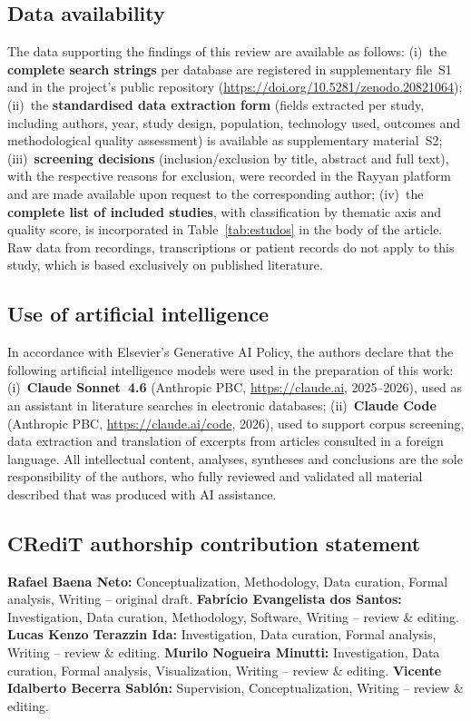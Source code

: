 \documentclass[review,12pt]{elsarticle}
\begin{document}
\subsection*{Data availability}
The data supporting the findings of this review are available as follows:
(i)~the \textbf{complete search strings} per database are registered in
supplementary file~S1 and in the project's public repository
(\url{https://doi.org/10.5281/zenodo.20821064});
(ii)~the \textbf{standardised data extraction form} (fields extracted per
study, including authors, year, study design, population, technology used,
outcomes and methodological quality assessment) is available as supplementary
material~S2;
(iii)~\textbf{screening decisions} (inclusion/exclusion by title, abstract
and full text), with the respective reasons for exclusion, were recorded in
the Rayyan platform \citep{Ouzzani2016} and are made available upon request
to the corresponding author;
(iv)~the \textbf{complete list of included studies}, with classification by
thematic axis and quality score, is incorporated in Table~\ref{tab:estudos}
in the body of the article.
Raw data from recordings, transcriptions or patient records do not apply to
this study, which is based exclusively on published literature.

\subsection*{Use of artificial intelligence}
In accordance with Elsevier's Generative AI Policy, the authors declare that
the following artificial intelligence models were used in the preparation of
this work:
(i)~\textbf{Claude Sonnet~4.6} (Anthropic PBC,
\url{https://claude.ai}, 2025--2026), used as an assistant in literature
searches in electronic databases;
(ii)~\textbf{Claude Code} (Anthropic PBC,
\url{https://claude.ai/code}, 2026), used to support corpus screening, data
extraction and translation of excerpts from articles consulted in a foreign
language.
All intellectual content, analyses, syntheses and conclusions are the sole
responsibility of the authors, who fully reviewed and validated all material
described that was produced with AI assistance.

\subsection*{CRediT authorship contribution statement}
\textbf{Rafael Baena Neto:} Conceptualization, Methodology, Data curation,
Formal analysis, Writing -- original draft.
\textbf{Fabrício Evangelista dos Santos:} Investigation, Data curation,
Methodology, Software, Writing -- review \& editing.
\textbf{Lucas Kenzo Terazzin Ida:} Investigation, Data curation, Formal
analysis, Writing -- review \& editing.
\textbf{Murilo Nogueira Minutti:} Investigation, Data curation, Formal
analysis, Visualization, Writing -- review \& editing.
\textbf{Vicente Idalberto Becerra Sablón:} Supervision, Conceptualization,
Writing -- review \& editing.



\end{document}
